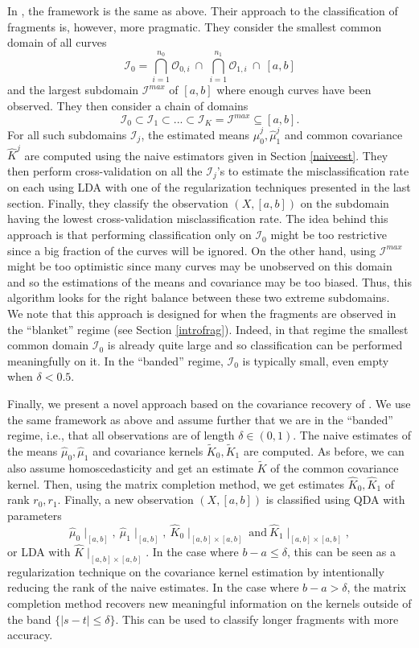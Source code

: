 \documentclass[10pt, a4paper]{report}
\newcommand{\I}[0]{\mathcal{I}}
\newcommand{\Oo}[0]{\mathcal{O}}
\theoremstyle{definition}
\theoremstyle{remark}
\begin{document}
In \cite{Kraus2}, the framework is the same as above. Their approach to the classification of fragments is, however, more pragmatic. They consider the smallest common domain of all curves
$$\I_0 = \bigcap_{i=1}^{n_0}\Oo_{0,i} \ \cap \ \bigcap_{i=1}^{n_1}\Oo_{1,i} \ \cap \ [a,b]$$
and the largest subdomain $\I^{max}$ of $[a,b]$ where enough curves have been observed. They then consider a chain of domains
$$\I_0 \subset \I_1 \subset ... \subset \I_K = \I^{max} \subseteq [a,b].$$
For all such subdomains $\I_j$, the estimated means $\hat{\mu}_0^j,\hat{\mu}_1^j$ and common covariance $\hat{K}^j$ are computed using the naive estimators given in Section \ref{naiveest}. They then perform cross-validation on all the $\I_j$'s to estimate the misclassification rate on each using LDA with one of the regularization techniques presented in the last section. Finally, they classify the observation $(X,[a,b])$ on the subdomain having the lowest cross-validation misclassification rate. The idea behind this approach is that performing classification only on $\I_0$ might be too restrictive since a big fraction of the curves will be ignored. On the other hand, using $\I^{max}$ might be too optimistic since many curves may be unobserved on this domain and so the estimations of the means and covariance may be too biased. Thus, this algorithm looks for the right balance between these two extreme subdomains.\\
We note that this approach is designed for when the fragments are observed in the ``blanket'' regime (see Section \ref{introfrag}). Indeed, in that regime the smallest common domain $\I_0$ is already quite large and so classification can be performed meaningfully on it. In the ``banded'' regime, $\I_0$ is typically small, even empty when $\delta<0.5$. 

Finally, we present a novel approach based on the covariance recovery of \cite{DP2}. We use the same framework as above and assume further that we are in the ``banded'' regime, i.e., that all observations are of length $\delta \in (0,1)$. The naive estimates of the means $\hat{\mu}_0,\hat{\mu}_1$ and covariance kernels $\tilde{K}_0,\tilde{K}_1$ are computed. As before, we can also assume homoscedasticity and get an estimate $\tilde{K}$ of the common covariance kernel. Then, using the matrix completion method, we get estimates $\hat{K}_0,\hat{K}_1$ of rank $r_0,r_1$. Finally, a new observation $(X,[a,b])$ is classified using QDA with parameters 
$$\hat{\mu}_0\!\mid_{[a,b]}, \ \hat{\mu}_1\!\mid_{[a,b]}, \  \hat{K}_0\!\mid_{[a,b]\times[a,b]} \ \text{and} \ \hat{K}_1\!\mid_{[a,b]\times[a,b]},$$
or LDA with $\hat{K}\!\mid_{[a,b]\times[a,b]}$. In the case where $b-a\leq \delta$, this can be seen as a regularization technique on the covariance kernel estimation by intentionally reducing the rank of the naive estimates. In the case where $b-a>\delta$, the matrix completion method recovers new meaningful information on the kernels outside of the band $\{|s-t| \leq \delta\}$. This can be used to classify longer fragments with more accuracy.
\end{document}
